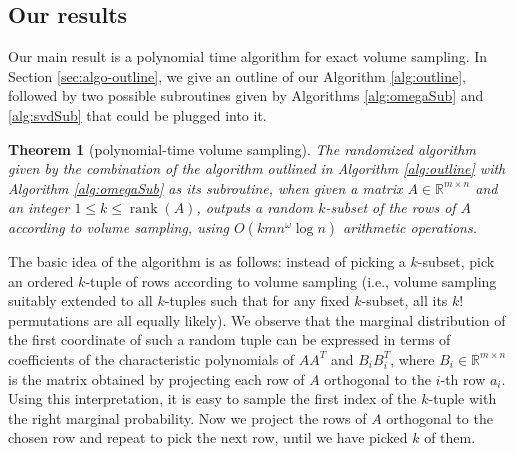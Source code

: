 \documentclass[11pt]{article}
\newcommand{\rank}{\operatorname{rank}}
\newtheorem{theorem}{Theorem}
\def\reals{\mathbb{R}}
\begin{document}
\subsection{Our results}
Our main result is a polynomial time algorithm for exact volume sampling. In Section \ref{sec:algo-outline}, we give an outline of our Algorithm \ref{alg:outline}, followed by two possible subroutines given by Algorithms  \ref{alg:omegaSub} and \ref{alg:svdSub} that could be plugged into it.

\begin{theorem}[polynomial-time volume sampling]\label{thm:polytimeVS}
The randomized algorithm given by the combination of the algorithm outlined in Algorithm \ref{alg:outline} with Algorithm \ref{alg:omegaSub} as its subroutine, when given a matrix $A \in \reals^{m \times n}$ and an integer $1 \leq k \leq \rank(A)$, outputs a random $k$-subset of the rows of $A$ according to volume sampling, using $O(kmn^\omega \log n)$ arithmetic operations.
\end{theorem}
The basic idea of the algorithm is as follows: instead of picking a $k$-subset, pick an ordered $k$-tuple of rows according to volume sampling (i.e., volume sampling suitably extended to all $k$-tuples such that for any fixed $k$-subset, all its $k!$ permutations are all equally likely). We observe that the marginal distribution of the first coordinate of such a random tuple can be expressed in terms of coefficients of the characteristic polynomials of $AA^{T}$ and $B_{i} B_{i}^{T}$, where $B_{i} \in \reals^{m \times n}$ is the matrix obtained by projecting each row of $A$ orthogonal to the $i$-th row $a_{i}$. Using this interpretation, it is easy to sample the first index of the $k$-tuple with the right marginal probability. Now we project the rows of $A$ orthogonal to the chosen row and repeat to pick the next row, until we have picked $k$ of them.
\end{document}
